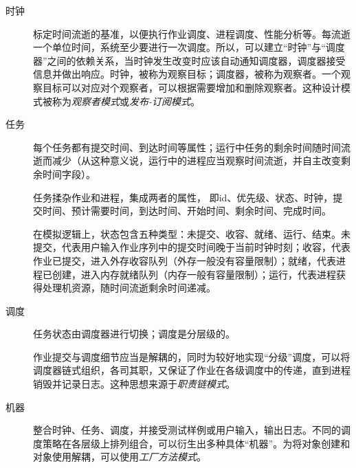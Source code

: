 \documentclass[UTF8]{ctexart}
\begin{document}
\begin{description}
    \item[时钟] 标定时间流逝的基准，以便执行作业调度、进程调度、性能分析等。每流逝一个单位时间，系统至少要进行一次调度。所以，可以建立“时钟”与“调度器”之间的依赖关系，当时钟发生改变时应该自动通知调度器，调度器接受信息并做出响应。时钟，被称为观察目标；调度器，被称为观察者。一个观察目标可以对应对个观察者，可以根据需要增加和删除观察者。这种设计模式被称为\emph{观察者模式}或\emph{发布-订阅模式}。
    \item[任务] 每个任务都有提交时间、到达时间等属性；运行中任务的剩余时间随时间流逝而减少（从这种意义说，运行中的进程应当观察时间流逝，并自主改变剩余时间字段）。

        任务揉杂作业和进程，集成两者的属性，
        即id、优先级、状态、时钟，提交时间、预计需要时间，到达时间、开始时间、剩余时间、完成时间。

        在模拟逻辑上，状态包含五种类型：未提交、收容、就绪、运行、结束。未提交，代表用户输入作业序列中的提交时间晚于当前时钟时刻；收容，代表作业已提交，进入外存收容队列（外存一般没有容量限制）；就绪，代表进程已创建，进入内存就绪队列（内存一般有容量限制）；运行，代表进程获得处理机资源，随时间流逝剩余时间递减。
    \item[调度] 任务状态由调度器进行切换；调度是分层级的。

        作业提交与调度细节应当是解耦的，同时为较好地实现“分级”调度，可以将调度器链式组织，各司其职，又保证了作业在各级调度中的传递，直到进程销毁并记录日志。这种思想来源于\emph{职责链模式}。

    \item[机器] 整合时钟、任务、调度，并接受测试样例或用户输入，输出日志。不同的调度策略在各层级上排列组合，可以衍生出多种具体“机器”。为将对象创建和对象使用解耦，可以使用\emph{工厂方法模式}。
\end{description}
\end{document}
